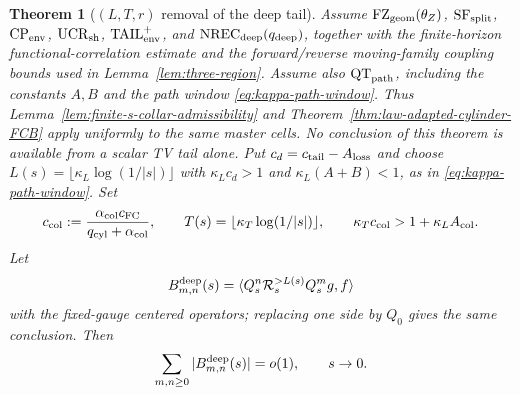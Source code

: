 \documentclass[11pt]{article}
\newtheorem{theorem}{Theorem}[section]
\begin{document}
\begin{theorem}[$(L,T,r)$ removal of the deep tail]
\label{thm:time-depth-diagonal}
Assume $\mathrm{FZ}_{\rm geom}(\theta_Z)$,
$\mathrm{SF}_{\rm split}$, $\mathrm{CP}_{\rm env}$,
$\mathrm{UCR}_{\rm sh}$, $\mathrm{TAIL}_{\rm env}^{+}$, and
$\mathrm{NREC}_{\rm deep}(q_{\rm deep})$, together with the finite-horizon
functional-correlation estimate and the forward/reverse moving-family
coupling bounds used in Lemma~\ref{lem:three-region}.  Assume also
$\mathrm{QT}_{\rm path}$, including the constants $A,B$ and the path window
\eqref{eq:kappa-path-window}.  Thus
Lemma~\ref{lem:finite-s-collar-admissibility} and
Theorem~\ref{thm:law-adapted-cylinder-FCB} apply uniformly to the same
master cells.  No conclusion of this theorem is available from a scalar TV
tail alone.
Put $c_d=c_{\rm tail}-A_{\rm loss}$ and choose
$L(s)=\lfloor\kappa_L\log(1/|s|)\rfloor$ with
$\kappa_Lc_d>1$ and $\kappa_L(A+B)<1$, as in
\eqref{eq:kappa-path-window}.  Set
\begin{equation}
\label{eq:time-depth-threshold}
 c_{\rm col}:=
 \frac{\alpha_{\rm col}c_{\rm FC}}
      {q_{\rm cyl}+\alpha_{\rm col}},\qquad
 T(s)=\lfloor\kappa_T\log(1/|s|)\rfloor,\qquad
 \kappa_Tc_{\rm col}>1+\kappa_LA_{\rm col}.
\end{equation}
Let
\[
 B^{\rm deep}_{m,n}(s)=
 \langle Q_s^n\mathcal R_s^{>L(s)}Q_s^mg,f\rangle
\]
with the fixed-gauge centered operators; replacing one side by $Q_0$ gives
the same conclusion.  Then
\begin{equation}
\label{eq:deep-tail-CM2-sum}
 \sum_{m,n\ge0}|B^{\rm deep}_{m,n}(s)|=o(1),
 \qquad s\to0.
\end{equation}
\end{theorem}
\end{document}
